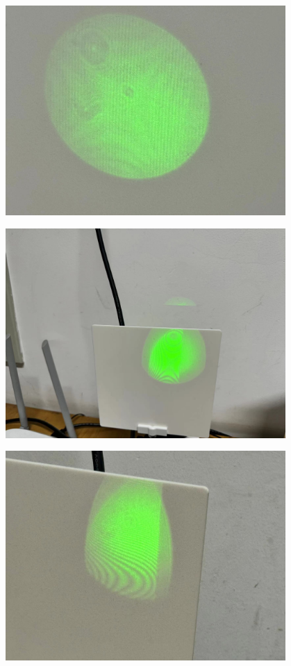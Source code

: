 \documentclass[10pt]{ctexart}
\begin{document}
\begin{minipage}{\textwidth} 
    \includegraphics[width=0.8\textwidth]{加入45度偏振片.jpg}
\end{minipage}
\begin{minipage}{\textwidth} 
    \includegraphics[width=0.8\textwidth]{其一.jpg}
\end{minipage}
\begin{minipage}{\textwidth} 
    \includegraphics[width=0.8\textwidth]{其二.jpg}
\end{minipage}
\end{document}

